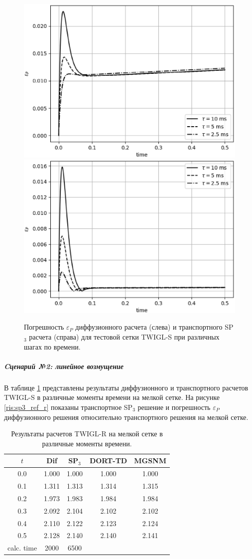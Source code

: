\documentclass{crm-article}
\begin{document}
\begin{figure}[ht]
\begin{center}
	\includegraphics[width=0.4\linewidth]{dif_tau_s.eps}\hspace{20pt}
	\includegraphics[width=0.4\linewidth]{sp3_tau_s.eps}\\
	\caption{\label{image:canonsummary} Погрешность $\varepsilon_P$ диффузионного расчета (слева) и транспортного SP$_3$ расчета (справа) для тестовой сетки TWIGL-S при различных шагах по времени.}
	\label{ris:tau_s}
\end{center}
\end{figure}

\subparagraph{Cценарий №2: линейное возмущение}
В таблице \ref{table:twigl-r} представлены результаты диффузионного и транспортного расчетов TWIGL-S в различные моменты времени на мелкой сетке.
На рисунке \ref{ris:sp3_ref_r} показаны транспортное SP$_3$ решение и погрешность $\varepsilon_P$ диффузионного решения относительно транспортного решения на мелкой сетке. 

\begin{table}[ht]
\caption{Результаты расчетов TWIGL-R на мелкой сетке в различные моменты времени.}
\label{table:twigl-r}
\begin{center}
\begin{tabular}{c c c c c}
\hline
$t$ & Dif & SP$_3$ & DORT-TD & MGSNM \\
\hline
0.0 & 1.000 & 1.000 & 1.000 & 1.000\\
0.1 & 1.311 & 1.313 & 1.314 & 1.315\\
0.2 & 1.973 & 1.983 & 1.984 & 1.984\\
0.3 & 2.092 & 2.104 & 2.102 & 2.102\\
0.4 & 2.110 & 2.122 & 2.123 & 2.124\\
0.5 & 2.128 & 2.140 & 2.140 & 2.141\\
\hline
calc. time & 2000 & 6500 \\
\end{tabular}
\end{center}
\end{table}
\end{document}
